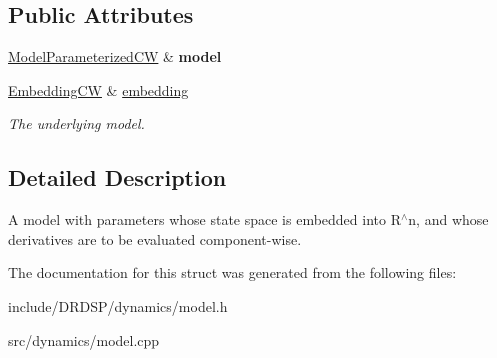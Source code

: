 \subsection*{Public Attributes}
\begin{DoxyCompactItemize}
\item 
\hypertarget{struct_d_r_d_s_p_1_1_model_parameterized_embedded_c_w_a33c7f535c705ffc2d8fd30842757b093}{\hyperlink{struct_d_r_d_s_p_1_1_model_parameterized_c_w}{Model\-Parameterized\-C\-W} \& {\bfseries model}}\label{struct_d_r_d_s_p_1_1_model_parameterized_embedded_c_w_a33c7f535c705ffc2d8fd30842757b093}

\item 
\hypertarget{struct_d_r_d_s_p_1_1_model_parameterized_embedded_c_w_a38c7555dcaadd84066f2746b035d35c4}{\hyperlink{struct_d_r_d_s_p_1_1_embedding_c_w}{Embedding\-C\-W} \& \hyperlink{struct_d_r_d_s_p_1_1_model_parameterized_embedded_c_w_a38c7555dcaadd84066f2746b035d35c4}{embedding}}\label{struct_d_r_d_s_p_1_1_model_parameterized_embedded_c_w_a38c7555dcaadd84066f2746b035d35c4}

\begin{DoxyCompactList}\small\item\em The underlying model. \end{DoxyCompactList}\end{DoxyCompactItemize}


\subsection{Detailed Description}
A model with parameters whose state space is embedded into R$^\wedge$n, and whose derivatives are to be evaluated component-\/wise. 

The documentation for this struct was generated from the following files\-:\begin{DoxyCompactItemize}
\item 
include/\-D\-R\-D\-S\-P/dynamics/model.\-h\item 
src/dynamics/model.\-cpp\end{DoxyCompactItemize}

